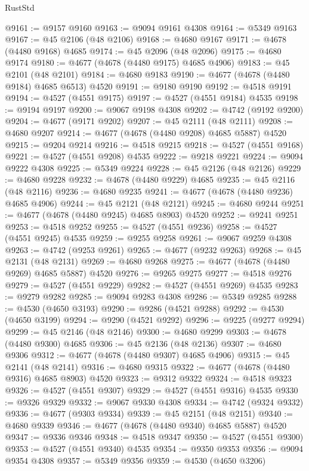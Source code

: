 \begin{lexlean}{RustStd}
\begin{coremodule}
@9161 := @9157 @9160
@9163 := @9094 @9161 @4308
@9164 := @5349 @9163
@9167 := @45 @2106 (@48 @2106)
@9168 := @4680 @9167
@9171 := @4678 (@4480 @9168) @4685
@9174 := @45 @2096 (@48 @2096)
@9175 := @4680 @9174
@9180 := @4677 (@4678 (@4480 @9175) @4685 @4906)
@9183 := @45 @2101 (@48 @2101)
@9184 := @4680 @9183
@9190 := @4677 (@4678 (@4480 @9184) @4685 @6513) @4520
@9191 := @9180 @9190
@9192 := @4518 @9191
@9194 := @4527 (@4551 @9175)
@9197 := @4527 (@4551 @9184) @4535
@9198 := @9194 @9197
@9200 := @9067 @9198 @4308
@9202 := @4742 (@9192 @9200)
@9204 := @4677 (@9171 @9202)
@9207 := @45 @2111 (@48 @2111)
@9208 := @4680 @9207
@9214 := @4677 (@4678 (@4480 @9208) @4685 @5887) @4520
@9215 := @9204 @9214
@9216 := @4518 @9215
@9218 := @4527 (@4551 @9168)
@9221 := @4527 (@4551 @9208) @4535
@9222 := @9218 @9221
@9224 := @9094 @9222 @4308
@9225 := @5349 @9224
@9228 := @45 @2126 (@48 @2126)
@9229 := @4680 @9228
@9232 := @4678 (@4480 @9229) @4685
@9235 := @45 @2116 (@48 @2116)
@9236 := @4680 @9235
@9241 := @4677 (@4678 (@4480 @9236) @4685 @4906)
@9244 := @45 @2121 (@48 @2121)
@9245 := @4680 @9244
@9251 := @4677 (@4678 (@4480 @9245) @4685 @8903) @4520
@9252 := @9241 @9251
@9253 := @4518 @9252
@9255 := @4527 (@4551 @9236)
@9258 := @4527 (@4551 @9245) @4535
@9259 := @9255 @9258
@9261 := @9067 @9259 @4308
@9263 := @4742 (@9253 @9261)
@9265 := @4677 (@9232 @9263)
@9268 := @45 @2131 (@48 @2131)
@9269 := @4680 @9268
@9275 := @4677 (@4678 (@4480 @9269) @4685 @5887) @4520
@9276 := @9265 @9275
@9277 := @4518 @9276
@9279 := @4527 (@4551 @9229)
@9282 := @4527 (@4551 @9269) @4535
@9283 := @9279 @9282
@9285 := @9094 @9283 @4308
@9286 := @5349 @9285
@9288 := @4530 (@4650 @3193)
@9290 := @9286 (@4521 @9288)
@9292 := @4530 (@4650 @3199)
@9294 := @9290 (@4521 @9292)
@9296 := @9225 (@9277 @9294)
@9299 := @45 @2146 (@48 @2146)
@9300 := @4680 @9299
@9303 := @4678 (@4480 @9300) @4685
@9306 := @45 @2136 (@48 @2136)
@9307 := @4680 @9306
@9312 := @4677 (@4678 (@4480 @9307) @4685 @4906)
@9315 := @45 @2141 (@48 @2141)
@9316 := @4680 @9315
@9322 := @4677 (@4678 (@4480 @9316) @4685 @8903) @4520
@9323 := @9312 @9322
@9324 := @4518 @9323
@9326 := @4527 (@4551 @9307)
@9329 := @4527 (@4551 @9316) @4535
@9330 := @9326 @9329
@9332 := @9067 @9330 @4308
@9334 := @4742 (@9324 @9332)
@9336 := @4677 (@9303 @9334)
@9339 := @45 @2151 (@48 @2151)
@9340 := @4680 @9339
@9346 := @4677 (@4678 (@4480 @9340) @4685 @5887) @4520
@9347 := @9336 @9346
@9348 := @4518 @9347
@9350 := @4527 (@4551 @9300)
@9353 := @4527 (@4551 @9340) @4535
@9354 := @9350 @9353
@9356 := @9094 @9354 @4308
@9357 := @5349 @9356
@9359 := @4530 (@4650 @3206)

\end{coremodule}
\end{lexlean}

